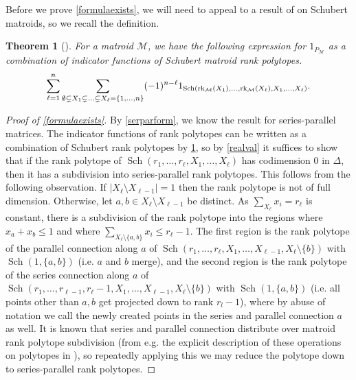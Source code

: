 \documentclass[12pt]{amsart}
\newcommand{\rk}{{\rm rk}}
\newcommand{\MM}{{\mathcal M}}
\theoremstyle{plain}
\newtheorem{Thm}{Theorem}[section]
\theoremstyle{definition}
\theoremstyle{remark}
\begin{document}
Before we prove \cref{formulaexists}, we will need to appeal to a result of \cite{Derksen} on Schubert matroids, so we recall the definition.



\begin{Thm}[\cite{Derksen}]\label{SchubertFinkThm}
For a matroid $\MM$, we have the following expression for $1_{P_\MM}$ as a combination of indicator functions of Schubert matroid rank polytopes.
$$\sum_{\ell=1}^n \sum_{\emptyset \subsetneq X_1 \subsetneq \ldots \subsetneq X_\ell=\{1,\ldots,n\}}(-1)^{n-\ell}1_{\operatorname{Sch}(\rk_{\MM}(X_1),\ldots,\rk_{\MM}(X_\ell),X_1,\ldots,X_\ell)}.$$
\end{Thm}

\begin{proof}[Proof of \cref{formulaexists}]

By \cref{serparform}, we know the result for series-parallel matrices. The indicator functions of rank polytopes can be written as a combination of Schubert rank polytopes by \cref{SchubertFinkThm}, so by \cref{realval} it suffices to show that if the rank polytope of $\operatorname{Sch}(r_1,\ldots,r_\ell,X_1,\ldots,X_\ell)$ has codimension $0$ in $\Delta$, then it has a subdivision into series-parallel rank polytopes. This follows from the following observation. If $|X_\ell\setminus X_{\ell-1}| =1$ then the rank polytope is not of full dimension. Otherwise, let $a, b \in X_\ell\setminus X_{\ell-1}$ be distinct. As $\sum_{X_\ell}x_i=r_\ell$ is constant, there is a subdivision of the rank polytope into the regions where $x_a + x_b \le 1$ and where $\sum_{X_\ell \setminus \{a, b\}}x_i \le r_\ell-1$. The first region is the rank polytope of the parallel connection along $a$ of $\operatorname{Sch}(r_1,\ldots,r_{\ell},X_1,\ldots,X_{\ell-1},X_\ell\setminus\{b\})$ with $\operatorname{Sch}(1,\{a,b\})$ (i.e. $a$ and $b$ merge), and the second region is the rank polytope of the series connection along $a$ of $\operatorname{Sch}(r_1,\ldots,r_{\ell-1},r_\ell-1,X_1,\ldots,X_{\ell-1},X_\ell\setminus \{b\})$ with $\operatorname{Sch}(1,\{a,b\})$ (i.e. all points other than $a,b$ get projected down to rank $r_l-1$), where by abuse of notation we call the newly created points in the series and parallel connection $a$ as well. It is known that series and parallel connection distribute over matroid rank polytope subdivision (from e.g. the explicit description of these operations on polytopes in \cite[Proof of Theorem 7.3]{FS12}), so repeatedly applying this we may reduce the polytope down to series-parallel rank polytopes.
\end{proof}
\end{document}
